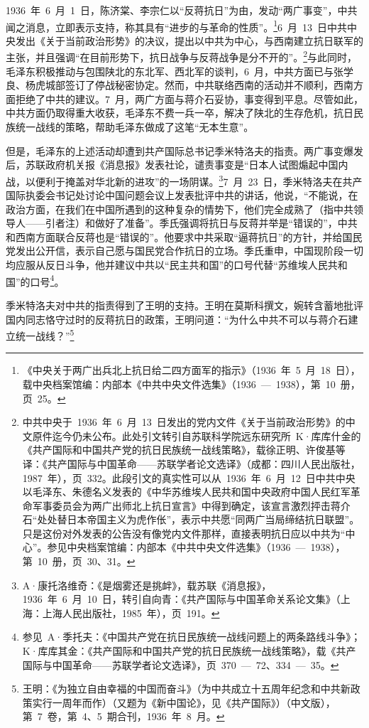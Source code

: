 1936~年~6~月~1~日，陈济棠、李宗仁以“反蒋抗日”为由，发动“两广事变”，中共闻之消息，立即表示支持，称其具有“进步的与革命的性质”。\footnote{《中央关于两广出兵北上抗日给二四方面军的指示》（1936~年~5~月~18~日），载中央档案馆编：内部本《中共中央文件选集》（1936~—~1938），第~10~册，页~25。}6~月~13~日中共中央发出《关于当前政治形势》的决议，提出以中共为中心，与西南建立抗日联军的主张，并且强调“在目前形势下，抗日战争与反蒋战争是分不开的”。\footnote{中共中央于~1936~年~6~月~13~日发出的党内文件《关于当前政治形势》的中文原件迄今仍未公布。此处引文转引自苏联科学院远东研究所~K·库库什金的《共产国际和中国共产党的抗日民族统一战线策略》，载徐正明、许俊基等译：《共产国际与中国革命——苏联学者论文选译》（成都：四川人民出版社，1987~年），页~332。此段引文的真实性可以从~1936~年~6~月~12~日中共中央以毛泽东、朱德名义发表的《中华苏维埃人民共和国中央政府中国人民红军革命军事委员会为两广出师北上抗日宣言》中得到确定，该宣言激烈抨击蒋介石“处处替日本帝国主义为虎作伥”，表示中共愿“同两广当局缔结抗日联盟”。只是这份对外发表的公告没有像党内文件那样，直接表明抗日应以中共为“中心”。参见中央档案馆编：内部本《中共中央文件选集》（1936~—~1938），第~10~册，页~30、31。}与此同时，毛泽东积极推动与包围陕北的东北军、西北军的谈判，6~月，中共方面已与张学良、杨虎城部签订了停战秘密协定。然而，中共联络西南的活动并不顺利，西南方面拒绝了中共的建议。7~月，两广方面与蒋介石妥协，事变得到平息。尽管如此，中共方面仍取得重大收获，毛泽东不费一兵一卒，解决了陕北的生存危机，抗日民族统一战线的策略，帮助毛泽东做成了这笔“无本生意”。

但是，毛泽东的上述活动却遭到共产国际总书记季米特洛夫的指责。两广事变爆发后，苏联政府机关报《消息报》发表社论，谴责事变是“日本人试图煽起中国内战，以便利于掩盖对华北新的进攻”的一场阴谋。\footnote{A·康托洛维奇：《是烟雾还是挑衅》，载苏联《消息报》，1936~年~6~月~10~日，转引自向青：《共产国际与中国革命关系论文集》（上海：上海人民出版社，1985~年），页~191。}7~月~23~日，季米特洛夫在共产国际执委会书记处讨论中国问题会议上发表批评中共的讲话，他说，“不能说，在政治方面，在我们在中国所遇到的这种复杂的情势下，他们完全成熟了（指中共领导人——引者注）和做好了准备”。季氏强调将抗日与反蒋并举是“错误的”，中共和西南方面联合反蒋也是“错误的”。他要求中共采取“逼蒋抗日”的方针，并给国民党发出公开信，表示自己愿与国民党合作抗日的立场。季氏重申，中国现阶段一切均应服从反日斗争，他并建议中共以“民主共和国”的口号代替“苏维埃人民共和国”的口号\footnote{参见~A·季托夫：《中国共产党在抗日民族统一战线问题上的两条路线斗争》；K·库库其金：《共产国际和中国共产党的抗日民族统一战线策略》，载《共产国际与中国革命——苏联学者论文选译》，页~370~—~72、334~—~35。}。

季米特洛夫对中共的指责得到了王明的支持。王明在莫斯科撰文，婉转含蓄地批评国内同志恪守过时的反蒋抗日的政策，王明问道：“为什么中共不可以与蒋介石建立统一战线？”\footnote{王明：《为独立自由幸福的中国而奋斗》（为中共成立十五周年纪念和中共新政策实行一周年而作）（又题为《新中国论》，见《共产国际》）（中文版），第~7~卷，第~4、5~期合刊，1936~年~8~月。}

